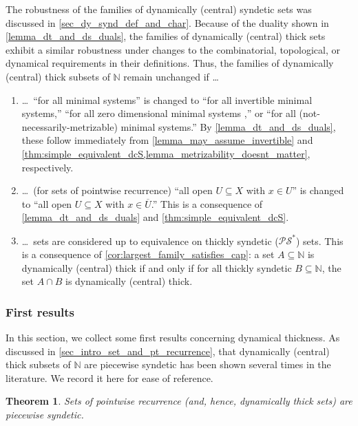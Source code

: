 \documentclass[letter,11pt]{article}
\theoremstyle{plain}
\newtheorem{theorem}{Theorem}
\theoremstyle{definition}
\theoremstyle{plain}
\theoremstyle{plain}
\numberwithin{equation}{section}
\newcommand{\N}{\mathbb{N}}
\newcommand{\PS}{\mathcal{PS}}
\begin{document}
The robustness of the families of dynamically (central) syndetic sets was discussed in \cref{sec_dy_synd_def_and_char}.  Because of the duality shown in \cref{lemma_dt_and_ds_duals}, the families of dynamically (central) thick sets exhibit a similar robustness under changes to the combinatorial, topological, or dynamical requirements in their definitions.  Thus, the families of dynamically (central) thick subsets of $\N$ remain unchanged if \dots
\begin{enumerate}
    \item \dots \ ``for all minimal systems'' is changed to ``for all invertible minimal systems,'' ``for all zero dimensional minimal systems ,'' or ``for all (not-necessarily-metrizable) minimal systems.'' By \cref{lemma_dt_and_ds_duals}, these follow immediately from \cref{lemma_may_assume_invertible} and \cref{thm:simple_equivalent_dcS,lemma_metrizability_doesnt_matter}, respectively.

    \item \dots \ (for sets of pointwise recurrence) ``all open $U \subseteq X$ with $x \in U$'' is changed to ``all open $U \subseteq X$ with $x \in \overline{U}$.'' This is a consequence of \cref{lemma_dt_and_ds_duals} and \cref{thm:simple_equivalent_dcS}.

    \item \dots \ sets are considered up to equivalence on thickly syndetic ($\PS^*$) sets.  This is a consequence of \cref{cor:largest_family_satisfies_cap}: a set $A \subseteq \N$ is dynamically (central) thick if and only if for all thickly syndetic $B \subseteq \N$, the set $A \cap B$ is dynamically (central) thick.
\end{enumerate}



\subsubsection{First results}
\label{sec_dt_first_results}

In this section, we collect some first results concerning dynamical thickness.  As discussed in \cref{sec_intro_set_and_pt_recurrence}, that dynamically (central) thick subsets of $\N$ are piecewise syndetic has been shown several times in the literature.  We record it here for ease of reference.

\begin{theorem}
\label{thm_dy_c_thick_is_ps}
    Sets of pointwise recurrence (and, hence, dynamically thick sets) are piecewise syndetic.
\end{theorem}
\end{document}
